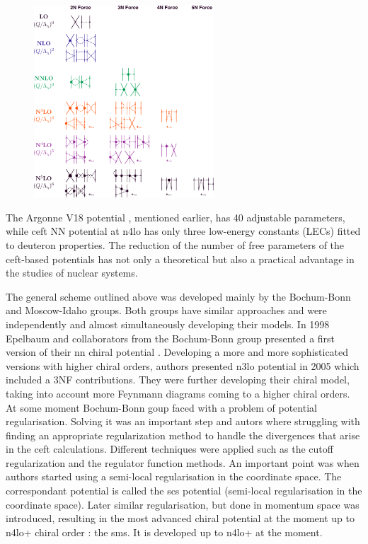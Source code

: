 \begin{figure}[h]
    \begin{center}
    \includegraphics[width=0.6\textwidth]{Figures/chiral.png}
    \end{center}
    \caption{}
    \label{chiral_diagrams}
\end{figure}

The Argonne V18 potential \cite{AV18Wiringa}, mentioned earlier, has 40 adjustable parameters,
while \gls{ceft} NN potential at \gls{n4lo} \cite{Machleidt2011} has only three low-energy constants (LECs) fitted to deuteron properties.
The reduction of the number of free parameters of the \gls{ceft}-based potentials
has not only a theoretical but also a practical advantage in the studies of nuclear systems.

The general scheme outlined above was developed mainly by the Bochum-Bonn and Moscow-Idaho groups.
Both groups have similar approaches and were independently and almost simultaneously
developing their models. In 1998 Epelbaum and collaborators from the Bochum-Bonn group 
presented a first version of their \gls{nn} chiral potential \cite{EPELBAOUM1998107, epelbaum2000two}.
Developing a more and more sophisticated versions with higher chiral orders, authors presented
\gls{n3lo} potential in 2005 \cite{epelbaum2005two} which included a 3NF contributions.
They were further developing their chiral model, taking into account more Feynmann diagrams
coming to a higher chiral orders.
At some moment Bochum-Bonn goup faced with a problem of potential regularisation\cite{skibinski_3H, Witala_2014}.
Solving it was an important step and autors
where struggling with finding an appropriate
regularization method to handle the divergences that arise in the \gls{ceft} calculations.
Different techniques were applied such as the cutoff regularization and the regulator function methods.
An important point was when authors started using a semi-local regularisation 
in the coordinate space. The correspondant potential is called  the \gls{scs} potential
(semi-local regularisation in the coordinate space)\cite{Epelbaum2014SCS}.
Later similar regularisation,
but done in momentum space was introduced, resulting in the most advanced chiral potential at the moment up to  
\gls{n4lo+} chiral order \cite{reinkrebs2018}: the \gls{sms}. It is developed up to \gls{n4lo+} at the moment.

